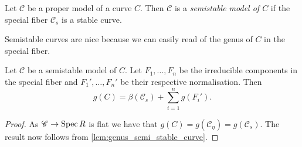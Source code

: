 \begin{definition}\label{def:semi_stable_model}
	Let  $\mathscr C$ be a proper model of a curve $C$. 
	Then $\mathscr C$ is a \emph{semistable model of $C$} if the special fiber $\mathscr C_s$ is a stable curve. 
\end{definition}

Semistable curves are nice because we can easily read of the genus of $C$ in the special fiber. 
\begin{lemma}\label{lem:genus_semi_stable_model}
	Let $\mathscr C$ be a semistable model of  $C$. 
	Let $F_1, \ldots, F_n$ be the irreducible components in the special fiber and  $F_1', \ldots, F_n'$ be their respective normalisation. 
	Then \[
		g(C) = \beta(\mathscr C_s) + \sum_{i = 1}^{n} g(F_i')
	.\] 
\end{lemma}
\begin{proof}
	As $\mathscr C \to \operatorname{Spec} R$ is flat we have that $g(C) = g(\mathscr C_\eta) = g(\mathscr C_s)$. 
	The result now follows from \cref{lem:genus_semi_stable_curve}. 
\end{proof}

